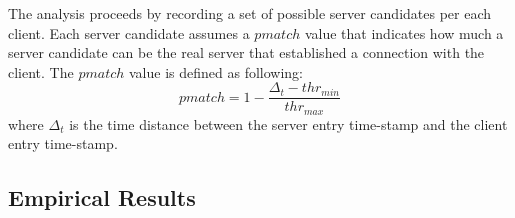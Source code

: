 The analysis proceeds by recording a set of possible server candidates 
 per each client. Each server candidate assumes a $pmatch$ value that
indicates how much a server candidate can be the real server that
established a connection with the client. The $pmatch$ value is defined
as following:
\begin{equation}
pmatch = 1 - \frac{\Delta_t - thr_{min}}{thr_{max}}
\end{equation}
where $\Delta_t$ is the time distance between the server entry time-stamp and
the client entry time-stamp.
\subsection{Empirical Results}
